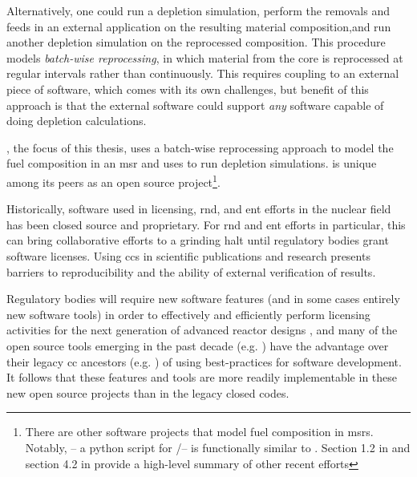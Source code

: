 Alternatively, one could run a depletion simulation, perform the removals and feeds in an external application on the resulting material composition,and run another depletion simulation on the reprocessed composition. This procedure models {\it batch-wise reprocessing}, in which material from the core is reprocessed at regular intervals rather than continuously. This requires coupling to an external piece of software, which comes with its own challenges, but benefit of this approach is that the
external software could
support {\it any} software capable of doing depletion calculations.

\SaltProc\cite{rykhlevskii_saltproc_2018}, the focus of this thesis, uses a batch-wise reprocessing approach to model the fuel composition in an \Gls{msr} and uses \SerpentTWO\cite{leppanen_serpent_2014} to run depletion simulations. \SaltProc is unique among its peers as an open source project\footnote{There are other software projects that model fuel composition in \Gls{msr}s. Notably, \ChemTriton\cite{betzler_molten_2017} -- a python script for
\SCALE/\TRITON -- is functionally similar to \SaltProc. Section 1.2 in \cite{rykhlevskii_fuel_2020} and section 4.2 in \cite{rykhlevskii_advanced_2018} provide a high-level summary of other recent efforts}.

Historically, software used in licensing, \gls{rnd}, and \gls{ent} efforts in the nuclear field has been closed source and proprietary. For \Gls{rnd} and \Gls{ent} efforts in particular, this can bring collaborative efforts to a grinding halt until regulatory bodies grant software licenses. Using \gls{cc}s in scientific publications and research presents barriers to reproducibility and the ability of external verification of results.
    
    Regulatory bodies will require new software features (and in some cases entirely new software tools) in order to effectively and efficiently perform licensing activities for the next generation of advanced reactor designs \cite{usnrc_nonlwr_2020-1}, and many of the open source tools emerging in the past decade (e.g. \OpenMC\cite{romano_openmc_2015}) have the advantage over their legacy \Gls{cc} ancestors (e.g. \SerpentTWO \cite{leppanen_serpent_2014}) of using best-practices for software development. It follows that these features and tools are more readily implementable in these new open source projects than in the legacy closed codes.
    
